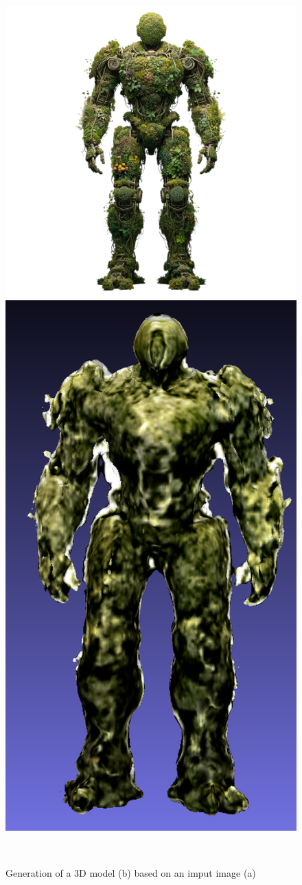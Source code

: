 \begin{figure}[ht]
    \centering
      \includegraphics[width=.36\columnwidth]{etc/a robot made out of plants/wonder3d/plantRobot}
      \includegraphics[width=.25\columnwidth]{etc/a robot made out of plants/wonder3d/wonder3d_plantrobot_model_resized}
      \caption{Generation of a 3D model (b) based on an imput image (a)}~\label{fig:inputWonder3d}
  \end{figure}